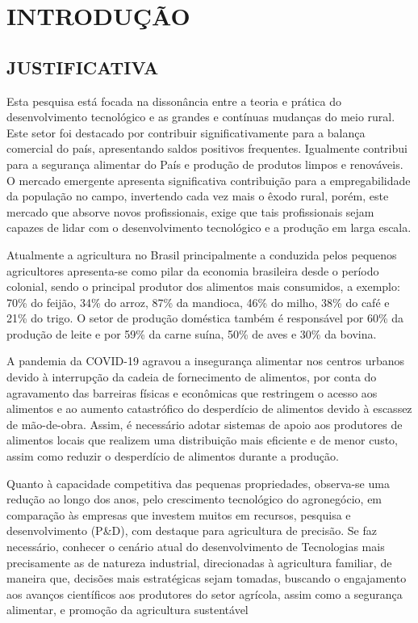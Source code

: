 \chapter{INTRODUÇÃO}



\section{JUSTIFICATIVA}

Esta pesquisa está focada na dissonância entre a teoria e prática do desenvolvimento tecnológico e as grandes e contínuas mudanças do meio rural. Este setor foi destacado por contribuir significativamente para a balança comercial do país, apresentando saldos positivos frequentes. Igualmente contribui para a segurança alimentar do País e produção de produtos limpos e renováveis. O mercado emergente apresenta significativa contribuição para a empregabilidade da população no campo, invertendo cada vez mais o êxodo rural, porém, este mercado que absorve novos profissionais, exige que tais profissionais sejam capazes de lidar com o desenvolvimento tecnológico e a produção em larga escala. 

Atualmente a agricultura no Brasil principalmente a conduzida pelos pequenos agricultores apresenta-se como pilar da economia brasileira desde o período colonial, sendo o principal produtor dos alimentos mais consumidos, a exemplo: 70\% do feijão, 34\% do arroz, 87\% da mandioca, 46\% do milho, 38\% do café e 21\% do trigo. O setor de produção doméstica também é responsável por 60\% da produção de leite e por 59\% da carne suína, 50\% de aves e 30\% da bovina. 

A pandemia da COVID-19 agravou a insegurança alimentar nos centros urbanos devido à interrupção da cadeia de fornecimento de alimentos, por conta do agravamento das barreiras físicas e econômicas que restringem o acesso aos alimentos e ao aumento catastrófico do desperdício de alimentos devido à escassez de mão-de-obra. Assim, é necessário adotar sistemas de apoio aos produtores de alimentos locais que realizem uma distribuição mais eficiente e de menor custo, assim como reduzir o desperdício de alimentos durante a produção. 

Quanto à capacidade competitiva das pequenas propriedades, observa-se uma redução ao longo dos anos, pelo crescimento tecnológico do agronegócio, em comparação às empresas que investem muitos em recursos, pesquisa e desenvolvimento (P\&D), com destaque para agricultura de precisão. Se faz necessário, conhecer o cenário atual do desenvolvimento de Tecnologias  mais precisamente as de natureza industrial, direcionadas à agricultura familiar, de maneira que, decisões mais estratégicas sejam tomadas, buscando o engajamento aos avanços científicos aos produtores do setor agrícola, assim como a segurança alimentar, e promoção da agricultura sustentável

